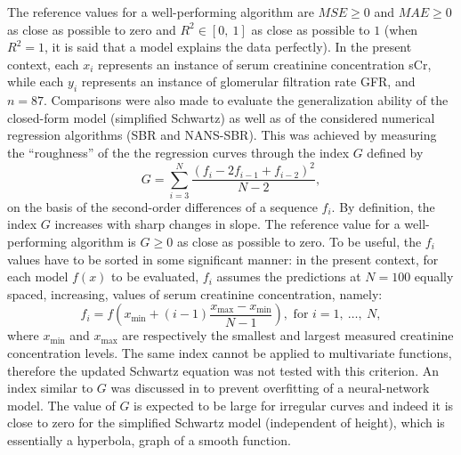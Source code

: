 \documentclass[10pt,final]{siamltex}
\begin{document}
The reference values for a well-performing algorithm are $\textit{MSE}\geq 0$ and $\textit{MAE}\geq 0$ as close as possible to zero and $R^2 \in [0,\ 1]$ as close as possible to $1$ (when $R^2=1$, it is said that a model explains the data perfectly).
In the present context, each $x_i$ represents an instance of serum creatinine concentration sCr, while each $y_i$ represents an instance of glomerular filtration rate GFR, and $n = 87$.
Comparisons were also made to evaluate the generalization ability of the closed-form model (simplified Schwartz) as well as of the considered numerical regression algorithms (SBR and NANS-SBR).
This was achieved by measuring the ``roughness'' of the the regression curves through the index $G$ defined by
%
\begin{equation}
  G = \sum_{i=3}^{N}{\frac{(f_i-2f_{i-1}+f_{i-2})^2}{N-2}},
\end{equation}
%
on the basis of the second-order differences of a sequence $f_i$. By definition, the index $\textit{G}$ increases with sharp changes in slope. The reference value for a well-performing algorithm is $G\geq 0$ as close as possible to zero. To be useful, the $f_i$ values have to be sorted in some significant manner: in the present context, for each model $f(x)$ to be evaluated, $f_i$ assumes the predictions at $N = 100$ equally spaced, increasing, values of serum creatinine concentration, namely:
%
\begin{equation}\label{eqn_sampl}
  f_i = f\left(x_\mathrm{min} + (i-1)\frac{x_\mathrm{max}-x_\mathrm{min}}{N-1}\right), \text{ for } i = 1,\ \ldots,\ N,
\end{equation}
%
where $x_\mathrm{min}$ and $x_\mathrm{max}$ are respectively the smallest and largest measured creatinine concentration levels. The same index cannot be applied to multivariate functions, therefore the updated Schwartz equation was not tested with this criterion.
%
%
An index similar to $\mathit{G}$ was discussed in \cite{bishop} to prevent overfitting of a neural-network model.
The value of $G$ is expected to be large for irregular curves and indeed it is close to zero for the simplified Schwartz model (independent of height), which is essentially a hyperbola, graph of a smooth function.
\end{document}
